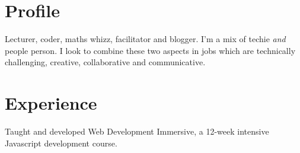 \documentclass[a4paper,nomath]{deedy-resume} %
\begin{document}

\lastupdated %


%
\begin{minipage}[t]{0.66\textwidth} %


    \section{Profile}
    Lecturer, coder, maths whizz, facilitator and blogger.
	I'm a mix of techie \textit{and} people person. I look to combine these two aspects in jobs which are technically challenging, creative, collaborative and communicative.


    \section{Experience}


    \vspace{\topsep} %
    \begin{tightitemize}
    	\item Taught and developed Web Development Immersive, a 12-week intensive Javascript development course.
    	

\end{tightitemize}
\end{minipage}
\end{document}
